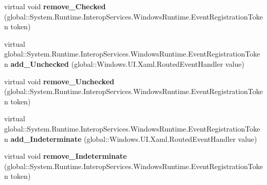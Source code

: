 \begin{DoxyCompactItemize}
\item 
\mbox{\label{class_windows_1_1_u_i_1_1_xaml_1_1_controls_1_1_primitives_1_1_toggle_button_ab578caf9f875da4e2d95db0a1340c425}} 
virtual void {\bfseries remove\+\_\+\+Checked} (global\+::\+System.\+Runtime.\+Interop\+Services.\+Windows\+Runtime.\+Event\+Registration\+Token token)
\item 
\mbox{\label{class_windows_1_1_u_i_1_1_xaml_1_1_controls_1_1_primitives_1_1_toggle_button_a9bee5e40662d9de8fea1d16b5bb00d02}} 
virtual global\+::\+System.\+Runtime.\+Interop\+Services.\+Windows\+Runtime.\+Event\+Registration\+Token {\bfseries add\+\_\+\+Unchecked} (global\+::\+Windows.\+U\+I.\+Xaml.\+Routed\+Event\+Handler value)
\item 
\mbox{\label{class_windows_1_1_u_i_1_1_xaml_1_1_controls_1_1_primitives_1_1_toggle_button_ab20e6cc31c1ae3791da88ef65f9fffc3}} 
virtual void {\bfseries remove\+\_\+\+Unchecked} (global\+::\+System.\+Runtime.\+Interop\+Services.\+Windows\+Runtime.\+Event\+Registration\+Token token)
\item 
\mbox{\label{class_windows_1_1_u_i_1_1_xaml_1_1_controls_1_1_primitives_1_1_toggle_button_a1f1913eba8709563eba2ffc6ada7b337}} 
virtual global\+::\+System.\+Runtime.\+Interop\+Services.\+Windows\+Runtime.\+Event\+Registration\+Token {\bfseries add\+\_\+\+Indeterminate} (global\+::\+Windows.\+U\+I.\+Xaml.\+Routed\+Event\+Handler value)
\item 
\mbox{\label{class_windows_1_1_u_i_1_1_xaml_1_1_controls_1_1_primitives_1_1_toggle_button_af20454c3f1b1b6b81eb8483851df5397}} 
virtual void {\bfseries remove\+\_\+\+Indeterminate} (global\+::\+System.\+Runtime.\+Interop\+Services.\+Windows\+Runtime.\+Event\+Registration\+Token token)
\item 
\mbox{\label{class_windows_1_1_u_i_1_1_xaml_1_1_controls_1_1_primitives_1_1_toggle_button_a49287addc0d795495badcb684663bfbb}} 

\end{DoxyCompactItemize}
